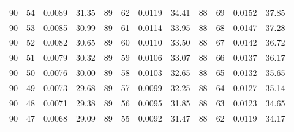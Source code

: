 \begin{tabular}{llll|llll|llll}
90 & 54 & 0.0089 & 31.35 & 89 & 62 & 0.0119 & 34.41 & 88 & 69 & 0.0152 & 37.85\\
90 & 53 & 0.0085 & 30.99 & 89 & 61 & 0.0114 & 33.95 & 88 & 68 & 0.0147 & 37.28\\
90 & 52 & 0.0082 & 30.65 & 89 & 60 & 0.0110 & 33.50 & 88 & 67 & 0.0142 & 36.72\\
90 & 51 & 0.0079 & 30.32 & 89 & 59 & 0.0106 & 33.07 & 88 & 66 & 0.0137 & 36.17\\
90 & 50 & 0.0076 & 30.00 & 89 & 58 & 0.0103 & 32.65 & 88 & 65 & 0.0132 & 35.65\\
90 & 49 & 0.0073 & 29.68 & 89 & 57 & 0.0099 & 32.25 & 88 & 64 & 0.0127 & 35.14\\
90 & 48 & 0.0071 & 29.38 & 89 & 56 & 0.0095 & 31.85 & 88 & 63 & 0.0123 & 34.65\\
90 & 47 & 0.0068 & 29.09 & 89 & 55 & 0.0092 & 31.47 & 88 & 62 & 0.0119 & 34.17\\
\bottomrule
\end{tabular}
\newpage
